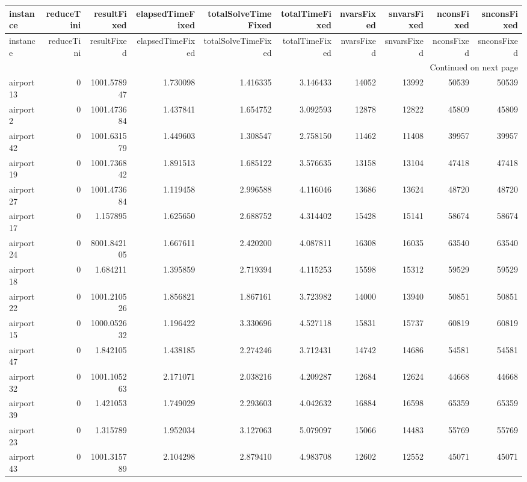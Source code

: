\begin{longtable}{|l|r|r|r|r|r|r|r|r|r|}
\toprule
instance & reduceTini & resultFixed & elapsedTimeFixed & totalSolveTimeFixed & totalTimeFixed & nvarsFixed & snvarsFixed & nconsFixed & snconsFixed \\
\midrule
\endfirsthead
\toprule
instance & reduceTini & resultFixed & elapsedTimeFixed & totalSolveTimeFixed & totalTimeFixed & nvarsFixed & snvarsFixed & nconsFixed & snconsFixed \\
\midrule
\endhead
\midrule
\multicolumn{10}{r}{Continued on next page} \\
\midrule
\endfoot
\bottomrule
\endlastfoot
airport13 & 0 & 1001.578947 & 1.730098 & 1.416335 & 3.146433 & 14052 & 13992 & 50539 & 50539 \\
airport2 & 0 & 1001.473684 & 1.437841 & 1.654752 & 3.092593 & 12878 & 12822 & 45809 & 45809 \\
airport42 & 0 & 1001.631579 & 1.449603 & 1.308547 & 2.758150 & 11462 & 11408 & 39957 & 39957 \\
airport19 & 0 & 1001.736842 & 1.891513 & 1.685122 & 3.576635 & 13158 & 13104 & 47418 & 47418 \\
airport27 & 0 & 1001.473684 & 1.119458 & 2.996588 & 4.116046 & 13686 & 13624 & 48720 & 48720 \\
airport17 & 0 & 1.157895 & 1.625650 & 2.688752 & 4.314402 & 15428 & 15141 & 58674 & 58674 \\
airport24 & 0 & 8001.842105 & 1.667611 & 2.420200 & 4.087811 & 16308 & 16035 & 63540 & 63540 \\
airport18 & 0 & 1.684211 & 1.395859 & 2.719394 & 4.115253 & 15598 & 15312 & 59529 & 59529 \\
airport22 & 0 & 1001.210526 & 1.856821 & 1.867161 & 3.723982 & 14000 & 13940 & 50851 & 50851 \\
airport15 & 0 & 1000.052632 & 1.196422 & 3.330696 & 4.527118 & 15831 & 15737 & 60819 & 60819 \\
airport47 & 0 & 1.842105 & 1.438185 & 2.274246 & 3.712431 & 14742 & 14686 & 54581 & 54581 \\
airport32 & 0 & 1001.105263 & 2.171071 & 2.038216 & 4.209287 & 12684 & 12624 & 44668 & 44668 \\
airport39 & 0 & 1.421053 & 1.749029 & 2.293603 & 4.042632 & 16884 & 16598 & 65359 & 65359 \\
airport23 & 0 & 1.315789 & 1.952034 & 3.127063 & 5.079097 & 15066 & 14483 & 55769 & 55769 \\
airport43 & 0 & 1001.315789 & 2.104298 & 2.879410 & 4.983708 & 12602 & 12552 & 45071 & 45071 \\

\end{longtable}
